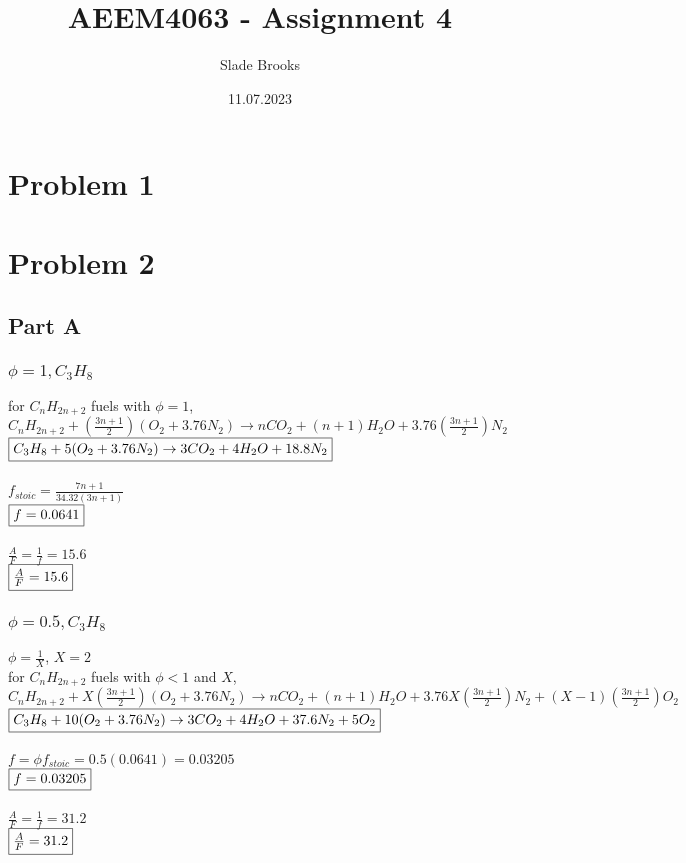 \documentclass{article}
\title{AEEM4063 - Assignment 4}
\author{Slade Brooks}
\date{11.07.2023}
\begin{document}
\maketitle

\section*{Problem 1}

\section*{Problem 2}
\subsection*{Part A}
\subsubsection*{$\phi=1, C_3H_8$}
for $C_nH_{2n+2}$ fuels with $\phi=1$, \\
$C_nH_{2n+2}+(\frac{3n+1}{2})(O_2+3.76N_2) \rightarrow nCO_2 + (n+1)H_2O +3.76(\frac{3n+1}{2})N_2$ \\
$\fbox{$C_3H_8+5(O_2+3.76N_2)\rightarrow 3CO_2+4H_2O+18.8N_2$}$ \\\\
$f_{stoic}=\frac{7n+1}{34.32(3n+1)}$ \\
$\fbox{$f=0.0641$}$ \\\\
$\frac{A}{F}=\frac{1}{f}=15.6$ \\
$\fbox{$\frac{A}{F}=15.6$}$

\subsubsection*{$\phi=0.5, C_3H_8$}
$\phi=\frac{1}{X}$, $X=2$ \\
for $C_nH_{2n+2}$ fuels with $\phi<1$ and $X$, \\
$C_nH_{2n+2}+X(\frac{3n+1}{2})(O_2+3.76N_2) \rightarrow nCO_2 + (n+1)H_2O +3.76X(\frac{3n+1}{2})N_2 +
(X-1)(\frac{3n+1}{2})O_2$ \\
$\fbox{$C_3H_8+10(O_2+3.76N_2)\rightarrow 3CO_2+4H_2O+37.6N_2+5O_2$}$ \\\\
$f=\phi f_{stoic}=0.5(0.0641)=0.03205$ \\
$\fbox{$f=0.03205$}$ \\\\
$\frac{A}{F}=\frac{1}{f}=31.2$ \\
$\fbox{$\frac{A}{F}=31.2$}$
\end{document}
